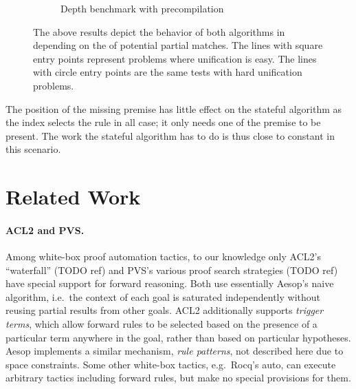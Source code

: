 \documentclass[runningheads]{llncs}
\begin{document}
\begin{figure}
\begin{subfigure}{.5\textwidth}
    \caption{Depth benchmark with precompilation}
    \label{fig:erase-precomp}
  \end{subfigure}
  \caption{The above results depict the behavior of both algorithms in depending on the  of potential partial matches. The lines with square entry points represent problems where unification is easy. The lines with circle entry points are the same tests with hard unification problems.}
  \label{fig:erase}
  \end{figure}

The position of the missing premise has little effect on the stateful algorithm as the index selects the rule in all case; it only needs one of the premise to be present.
The work the stateful algorithm has to do is thus close to constant in this scenario.

\section{Related Work}

\paragraph{ACL2 and PVS.}
Among white-box proof automation tactics, to our knowledge only ACL2's \enquote{waterfall} (TODO ref) and PVS's various proof search strategies (TODO ref) have special support for forward reasoning.
Both use essentially Aesop's naive algorithm, i.e.\ the context of each goal is saturated independently without reusing partial results from other goals.
ACL2 additionally supports \emph{trigger terms}, which allow forward rules to be selected based on the presence of a particular term anywhere in the goal, rather than based on particular hypotheses.
Aesop implements a similar mechanism, \emph{rule patterns}, not described here due to space constraints.
Some other white-box tactics, e.g.\ Rocq's auto, can execute arbitrary tactics including forward rules, but make no special provisions for them.
\end{document}
